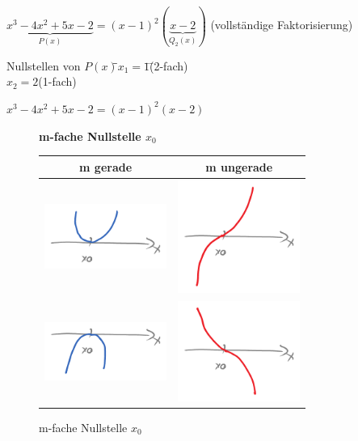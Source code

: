 \begin{enumerate}[A)]
	$\underbrace{x^3-4x^2+5x-2}_{P(x)}=(x-1)^2(\underbrace{x-2}_{Q_2(x)})$ (vollständige Faktorisierung)
	
	\begin{tabbing}
		Nullstellen von $P(x)$\=\qquad\=$x_1=1$\=\qquad\=(2-fach)\\
		\>\>$x_2=2$\>\>(1-fach)
	\end{tabbing}
	
	$x^3-4x^2+5x-2=(x-1)^2(x-2)$
	
	
	
	\begin{figure}[h!]
		{\bf m-fache Nullstelle $x_0$}
		
		\centering
		\begin{longtable}{c|c}
			m gerade & m ungerade\\
			\hline
			\includegraphics[width=4cm]{Bilder/112} & \includegraphics[width=4cm]{Bilder/114} \\
			\includegraphics[width=4cm]{Bilder/113} & \includegraphics[width=4cm]{Bilder/115} \\
		\end{longtable}
		\caption{m-fache Nullstelle $x_0$}
	\end{figure}
	

\end{enumerate}
